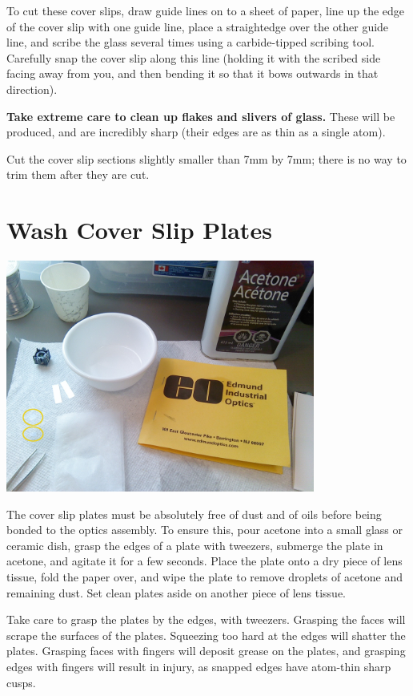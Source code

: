 To cut these cover slips, draw guide lines on to a sheet of paper, line
up the edge of the cover slip with one guide line, place a straightedge
over the other guide line, and scribe the glass several times using a
carbide-tipped scribing tool. Carefully snap the cover slip along this line
(holding it with the scribed side facing away from you, and then bending it
so that it bows outwards in that direction).

\textbf{Take extreme care to clean up flakes and slivers of glass.} These
will be produced, and are incredibly sharp (their edges are as thin as a
single atom).

Cut the cover slip sections slightly smaller than 7mm by 7mm; there is no way
to trim them after they are cut.

\section{Wash Cover Slip Plates}

\includegraphics[height=3in]{pics-c920/14-washingslides.jpg}

The cover slip plates must be absolutely free of dust and of oils before
being bonded to the optics assembly. To ensure this, pour acetone into a
small glass or ceramic dish, grasp the edges of a plate with tweezers,
submerge the plate in acetone, and agitate it for a few seconds. Place the
plate onto a dry piece of lens tissue, fold the paper over, and wipe the
plate to remove droplets of acetone and remaining dust. Set clean plates
aside on another piece of lens tissue.

Take care to grasp the plates by the edges, with tweezers. Grasping the
faces will scrape the surfaces of the plates. Squeezing too hard at the
edges will shatter the plates. Grasping faces with fingers will deposit
grease on the plates, and grasping edges with fingers will result in
injury, as snapped edges have atom-thin sharp cusps.

